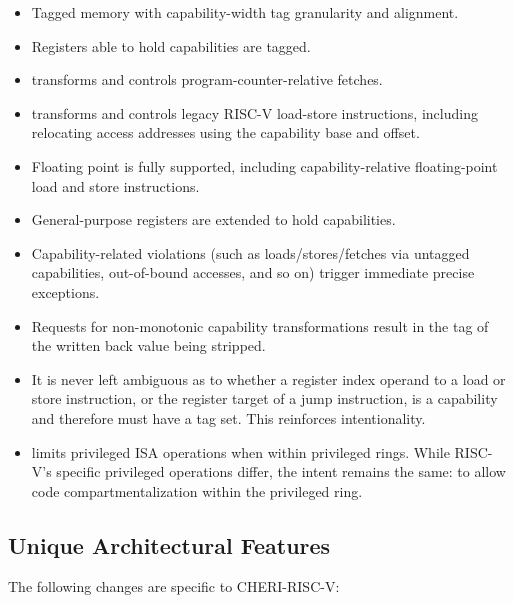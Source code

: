 \begin{itemize}
\item Tagged memory with capability-width tag granularity and alignment.
\item Registers able to hold capabilities are tagged.
\item \PCC{} transforms and controls program-counter-relative fetches.
\item \DDC{} transforms and controls legacy RISC-V load-store instructions,
  including relocating access addresses using the capability base and offset.
\item Floating point is fully supported, including capability-relative
  floating-point load and store instructions.
\item General-purpose registers are extended to hold capabilities.
\item Capability-related violations (such as loads/stores/fetches via untagged
  capabilities, out-of-bound accesses, and so on) trigger immediate precise
  exceptions.
\item Requests for non-monotonic capability transformations result in
  the tag of the written back value being stripped.
\item It is never left ambiguous as to whether a register index operand to a
  load or store instruction, or the register target of a jump instruction,
  is a capability and therefore must have a tag set.
  This reinforces intentionality.
\item \cappermASR limits privileged ISA
  operations when within privileged rings.
  While RISC-V's specific privileged operations differ, the intent remains the
  same: to allow code compartmentalization within the privileged ring.
\end{itemize}

\subsection{Unique Architectural Features}

The following changes are specific to CHERI-RISC-V:

